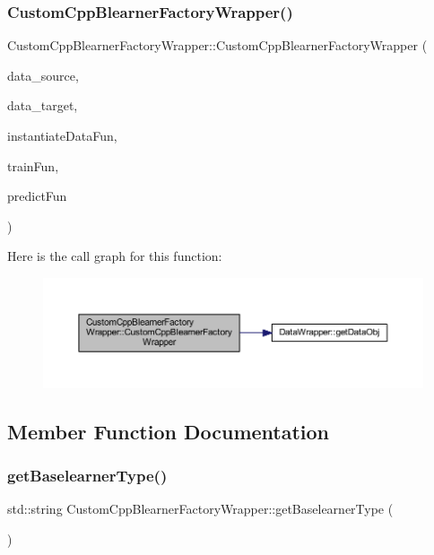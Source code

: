 \subsubsection{\texorpdfstring{Custom\+Cpp\+Blearner\+Factory\+Wrapper()}{CustomCppBlearnerFactoryWrapper()}}
{\footnotesize\ttfamily Custom\+Cpp\+Blearner\+Factory\+Wrapper\+::\+Custom\+Cpp\+Blearner\+Factory\+Wrapper (\begin{DoxyParamCaption}\item[{\mbox{\hyperlink{class_data_wrapper}{Data\+Wrapper}} \&}]{data\+\_\+source,  }\item[{\mbox{\hyperlink{class_data_wrapper}{Data\+Wrapper}} \&}]{data\+\_\+target,  }\item[{S\+E\+XP}]{instantiate\+Data\+Fun,  }\item[{S\+E\+XP}]{train\+Fun,  }\item[{S\+E\+XP}]{predict\+Fun }\end{DoxyParamCaption})\hspace{0.3cm}{\ttfamily [inline]}}

Here is the call graph for this function\+:\nopagebreak
\begin{figure}[H]
\begin{center}
\leavevmode
\includegraphics[width=350pt]{class_custom_cpp_blearner_factory_wrapper_a3ebf330b467d8c3f2ae2404369363877_cgraph}
\end{center}
\end{figure}


\subsection{Member Function Documentation}
\mbox{\label{class_custom_cpp_blearner_factory_wrapper_af2779851c3e2b288614a6d7152f5e3a1}} 
\subsubsection{\texorpdfstring{get\+Baselearner\+Type()}{getBaselearnerType()}}
{\footnotesize\ttfamily std\+::string Custom\+Cpp\+Blearner\+Factory\+Wrapper\+::get\+Baselearner\+Type (\begin{DoxyParamCaption}{ }\end{DoxyParamCaption})\hspace{0.3cm}{\ttfamily [inline]}}

